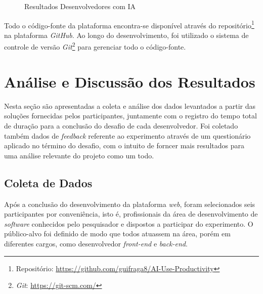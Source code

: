 \documentclass[english,brazilian]{UNISINOSartigo} %
\begin{document}
\begin{figure}[ht]
    \caption{Resultados Desenvolvedores com IA}
    \label{fig:resultados_com_ia_admin}
    \centering
    \footnotesize
    \begin{minipage}{.9\textwidth}
        \centering
    \end{minipage}
\end{figure}
\FloatBarrier

Todo o código-fonte da plataforma encontra-se disponível através do repositório\footnote{Repositório: \url{https://github.com/guifraga8/AI-Use-Productivity}} na plataforma \textit{GitHub}. Ao longo do desenvolvimento, foi utilizado o sistema de controle de versão \textit{Git}\footnote{\textit{Git}: \url{https://git-scm.com/}} para gerenciar todo o código-fonte.

\section{Análise e Discussão dos Resultados}

Nesta seção são apresentadas a coleta e análise dos dados levantados a partir das soluções fornecidas pelos participantes, juntamente com o registro do tempo total de duração para a conclusão do desafio de cada desenvolvedor. Foi coletado também dados de \textit{feedback} referente ao experimento através de um questionário aplicado no término do desafio, com o intuito de forncer mais resultados para uma análise relevante do projeto como um todo.

\subsection{Coleta de Dados}

Após a conclusão do desenvolvimento da plataforma \textit{web}, foram selecionados seis participantes por conveniência, isto é, profissionais da área de desenvolvimento de \textit{software} conhecidos pelo pesquisador e dispostos a participar do experimento. O público-alvo foi definido de modo que todos atuassem na área, porém em diferentes cargos, como desenvolvedor \textit{front-end} e \textit{back-end}.
\end{document}
